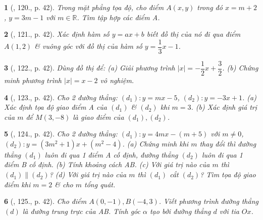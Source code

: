 \documentclass{article}
\newtheorem{baitoan}{}
\begin{document}
\begin{baitoan}[\cite{Tuyen_Toan_9_old}, 120., p. 42]
	Trong mặt phẳng tọa độ, cho điểm $A(x,y)$ trong đó $x = m + 2$, $y = 3m - 1$ với $m\in\mathbb{R}$. Tìm tập hợp các điểm A.
\end{baitoan}

\begin{baitoan}[\cite{Tuyen_Toan_9_old}, 121., p. 42]
	Xác định hàm số $y = ax + b$ biết đồ thị của nó đi qua điểm $A(1,2)$ \& vuông góc với đồ thị của hàm số $y = \dfrac{1}{3}x - 1$.
\end{baitoan}

\begin{baitoan}[\cite{Tuyen_Toan_9_old}, 122., p. 42]
	Dùng đồ thị để: (a) Giải phương trình $|x| = -\dfrac{1}{2}x + \dfrac{3}{2}$. (b) Chứng minh phương trình $|x| = x - 2$ vô nghiệm.
\end{baitoan}

\begin{baitoan}[\cite{Tuyen_Toan_9_old}, 123., p. 42]
	Cho 2 đường thẳng: $(d_1): y = mx - 5$, $(d_2):y = -3x + 1$. (a) Xác định tọa độ giao điểm A của $(d_1)$ \& $(d_2)$ khi $m = 3$. (b) Xác định giá trị của $m$ để $M(3,-8)$ là giao điểm của $(d_1),(d_2)$.
\end{baitoan}

\begin{baitoan}[\cite{Tuyen_Toan_9_old}, 124., p. 42]
	Cho 2 đường thẳng: $(d_1):y = 4mx - (m + 5)$ với $m\ne0$, $(d_2):y = (3m^2 + 1)x + (m^2 - 4)$. (a) Chứng minh khi $m$ thay đổi thì đường thẳng $(d_1)$ luôn đi qua 1 điểm A cố định, đường thẳng $(d_2)$ luôn đi qua 1 điểm B cố định. (b) Tính khoảng cách AB. (c) Với giá trị nào của $m$ thì $(d_1)\parallel(d_2)$? (d) Với giá trị nào của $m$ thì $(d_1)$ cắt $(d_2)$? Tìm tọa độ giao điểm khi $m = 2$ \& cho $m$ tổng quát.
\end{baitoan}

\begin{baitoan}[\cite{Tuyen_Toan_9_old}, 125., p. 42]
	Cho điểm $A(0,-1),B(-4,3)$. Viết phương trình đường thẳng $(d)$ là đường trung trực của AB. Tính góc $\alpha$ tạo bởi đường thẳng $d$ với tia $Ox$.
\end{baitoan}


\printbibliography[heading=bibintoc]
	
\end{document}
